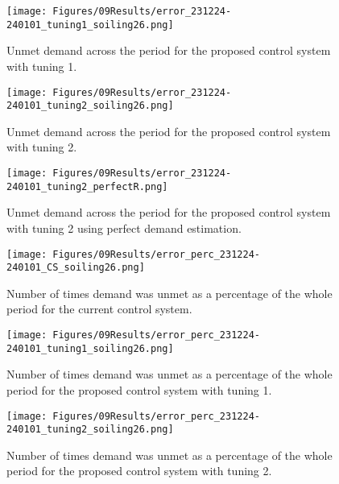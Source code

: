 \begin{figure}[h]
    \centering
    \texttt{[image: Figures/09Results/error\_231224-240101\_tuning1\_soiling26.png]}
    \caption[Unmet demand proposed control system 1]{Unmet demand across the period for the proposed control system with tuning 1. }
    \label{fig:error_231224-240101_tuning1_soiling26}
\end{figure}

\begin{figure}[h]
    \centering
    \texttt{[image: Figures/09Results/error\_231224-240101\_tuning2\_soiling26.png]}
    \caption[Unmet demand proposed control system 2]{Unmet demand across the period for the proposed control system with tuning 2. }
    \label{fig:error_231224-240101_tuning2_soiling26}
\end{figure}

\begin{figure}[h]
    \centering
    \texttt{[image: Figures/09Results/error\_231224-240101\_tuning2\_perfectR.png]}
    \caption[Unmet demand proposed control system 2 perfect R]{Unmet demand across the period for the proposed control system with tuning 2 using perfect demand estimation. }
    \label{fig:error_231224-240101_tuning2_perfectR}
\end{figure}

\begin{figure}[h]
    \centering
    \texttt{[image: Figures/09Results/error\_perc\_231224-240101\_CS\_soiling26.png]}
    \caption[Unmet demand portion current control system]{Number of times demand was unmet as a percentage of the whole period for the current control system. }
    \label{fig:error_perc_231224-240101_CS_soiling26}
\end{figure}

\begin{figure}[h]
    \centering
    \texttt{[image: Figures/09Results/error\_perc\_231224-240101\_tuning1\_soiling26.png]}
    \caption[Unmet demand portion proposed control system 1]{Number of times demand was unmet as a percentage of the whole period for the proposed control system with tuning 1. }
    \label{fig:error_perc_231224-240101_tuning1_soiling26}
\end{figure}

\begin{figure}[h]
    \centering
    \texttt{[image: Figures/09Results/error\_perc\_231224-240101\_tuning2\_soiling26.png]}
    \caption[Unmet demand portion proposed control system 2]{Number of times demand was unmet as a percentage of the whole period for the proposed control system with tuning 2. }
    \label{fig:error_perc_231224-240101_tuning2_soiling26}
\end{figure}

